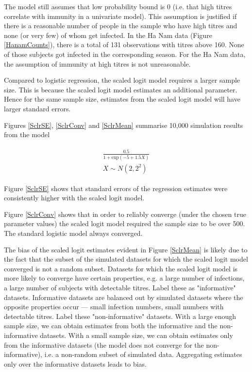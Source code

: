 The model still assumes that low probability bound is 0 (i.e. that high titres correlate with immunity in a univariate model). This assumption is justified if there is a reasonable number of people in the sample who have high titres and none (or very few) of whom get infected. In the Ha Nam data (Figure \ref{HanamCounts}), there is a total of 131 observations with titres above 160. None of those subjects got infected in the corresponding season. For the Ha Nam data, the assumption of immunity at high titres is not unreasonable.

Compared to logistic regression, the scaled logit model requires a larger sample size. This is because the scaled logit model estimates an additional parameter. Hence for the same sample size, estimates from the scaled logit model will have larger standard errors.

Figures \ref{SclrSE}, \ref{SclrConv} and \ref{SclrMean} summarise 10,000 simulation results from the model

\begin{align*}
	\begin{gathered}
		\frac{0.5}{1 + \text{exp}(-5 + 1.5 X)} \\
		X \sim N(2, 2^2)
	\end{gathered}
\end{align*}

Figure \ref{SclrSE} shows that standard errors of the regression estimates were consistently higher with the scaled logit model.

Figure \ref{SclrConv} shows that in order to reliably converge (under the chosen true parameter values) the scaled logit model required the sample size to be over 500. The standard logistic model always converged.

The bias of the scaled logit estimates evident in Figure \ref{SclrMean} is likely due to the fact that the subset of the simulated datasets for which the scaled logit model converged is not a random subset. Datasets for which the scaled logit model is more likely to converge have certain properties, e.g. a large number of infections, a large number of subjects with detectable titres. Label these as "informative" datasets. Informative datasets are balanced out by simulated datasets where the opposite properties occur --- small infection numbers, small numbers with detectable titres. Label these "non-informative" datasets. With a large enough sample size, we can obtain estimates from both the informative and the non-informative datasets. With a small sample size, we can obtain estimates only from the informative datasets (the model does not converge for the non-informative), i.e. a non-random subset of simulated data. Aggregating estimates only over the informative datasets leads to bias.

